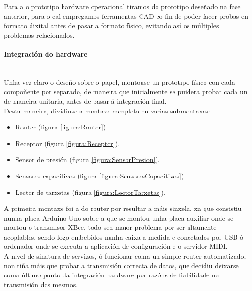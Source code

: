   Para a o prototipo hardware operacional tiramos do prototipo deseñado na fase
  anterior, para o cal empregamos ferramentas CAD co fin de poder facer probas
  en formato dixital antes de pasar a formato físico, evitando así os múltiples
  problemas relacionados.

   \paragraph{Integración do hardware}\mbox{}\\
   
   Unha vez claro o deseño sobre o papel, montouse un prototipo físico con cada
   compoñente por separado, de maneira que inicialmente se puidera probar cada
   un de maneira unitaria, antes de pasar á integración final. \\
   
   Desta maneira, dividiuse a montaxe completa en varias submontaxes:
   
   \begin{itemize}
    \item Router (figura \ref{figura:Router}).
    \item Receptor (figura \ref{figura:Receptor}).
    \item Sensor de presión (figura \ref{figura:SensorPresion}).
    \item Sensores capacitivos (figura \ref{figura:SensoresCapacitivos}).
    \item Lector de tarxetas (figura \ref{figura:LectorTarxetas}).
   \end{itemize}
   
   A primeira montaxe foi a do router por resultar a máis sinxela, xa que
   consistiu nunha placa Arduino Uno sobre a que se montou unha placa auxiliar
   onde se montou o transmisor XBee, todo sen maior problema por ser altamente
   acoplables, sendo logo embebidos nunha caixa a medida e conectados por USB
   ó ordenador onde se executa a aplicación de configuración e o servidor
   MIDI. \\
   
   A nivel de sinatura de servizos, ó funcionar coma un simple router
   automatizado, non tiña máis que probar a transmisión correcta de datos, que
   decidiu deixarse coma último punto da integración hardware por razóns de
   fiabilidade na transmisión dos mesmos. \\
   
